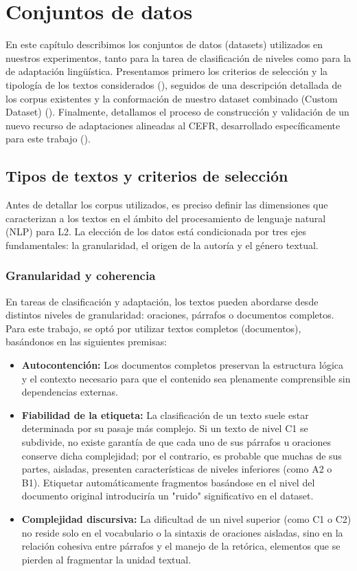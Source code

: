 \section{Conjuntos de datos}\label{sec:datos}
En este capítulo describimos los conjuntos de datos (datasets) utilizados en nuestros experimentos, tanto para la tarea de clasificación de niveles como para la de adaptación lingüística. Presentamos primero los criterios de selección y la tipología de los textos considerados (), seguidos de una descripción detallada de los corpus existentes y la conformación de nuestro dataset combinado (Custom Dataset) (). Finalmente, detallamos el proceso de construcción y validación de un nuevo recurso de adaptaciones alineadas al CEFR, desarrollado específicamente para este trabajo ().

\subsection{Tipos de textos y criterios de selección}\label{subsection:tipos_textos}
Antes de detallar los corpus utilizados, es preciso definir las dimensiones que caracterizan a los textos en el ámbito del procesamiento de lenguaje natural (NLP) para L2. La elección de los datos está condicionada por tres ejes fundamentales: la granularidad, el origen de la autoría y el género textual.

\subsubsection{Granularidad y coherencia}
En tareas de clasificación y adaptación, los textos pueden abordarse desde distintos niveles de granularidad: oraciones, párrafos o documentos completos. Para este trabajo, se optó por utilizar textos completos (documentos), basándonos en las siguientes premisas:
\begin{itemize}
    \item \textbf {Autocontención:} Los documentos completos preservan la estructura lógica y el contexto necesario para que el contenido sea plenamente comprensible sin dependencias externas.
    \item \textbf {Fiabilidad de la etiqueta:} La clasificación de un texto suele estar determinada por su pasaje más complejo. Si un texto de nivel C1 se subdivide, no existe garantía de que cada uno de sus párrafos u oraciones conserve dicha complejidad; por el contrario, es probable que muchas de sus partes, aisladas, presenten características de niveles inferiores (como A2 o B1). Etiquetar automáticamente fragmentos basándose en el nivel del documento original introduciría un "ruido" significativo en el dataset.

    \item \textbf {Complejidad discursiva:} La dificultad de un nivel superior (como C1 o C2) no reside solo en el vocabulario o la sintaxis de oraciones aisladas, sino en la relación cohesiva entre párrafos y el manejo de la retórica, elementos que se pierden al fragmentar la unidad textual.
\end{itemize}

